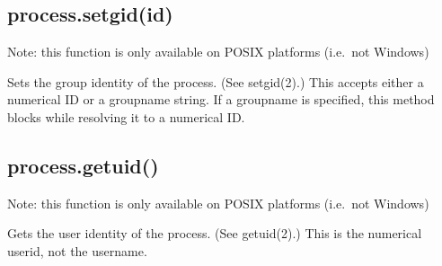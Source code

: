 \subsection{process.setgid(id)}

Note: this function is only available on POSIX platforms (i.e.~not
Windows)

Sets the group identity of the process. (See setgid(2).) This accepts
either a numerical ID or a groupname string. If a groupname is
specified, this method blocks while resolving it to a numerical ID.

\begin{Shaded}
\begin{Highlighting}[]
 \NormalTok{(} \NormalTok{&& }\NormalTok{) \{}
  \NormalTok{(} \NormalTok{+ }\NormalTok{());}
   \NormalTok{\{}
    \NormalTok{(}\NormalTok{);}
    \NormalTok{(} \NormalTok{+ }\NormalTok{());}
  \NormalTok{\}}
   
    \NormalTok{(} 
  \NormalTok{\}}
\NormalTok{\}}
\end{Highlighting}
\end{Shaded}

\subsection{process.getuid()}

Note: this function is only available on POSIX platforms (i.e.~not
Windows)

Gets the user identity of the process. (See getuid(2).) This is the
numerical userid, not the username.

\begin{Shaded}
\begin{Highlighting}[]
 \NormalTok{(}\NormalTok{) \{}
  \NormalTok{(} \NormalTok{+ }\NormalTok{());}
\NormalTok{\}}
\end{Highlighting}
\end{Shaded}

